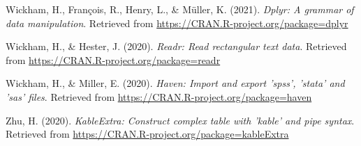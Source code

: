 \documentclass[
  english,
  man]{apa6}
\newlength{\cslhangindent}
\newenvironment{cslreferences}%
  {\setlength{\parindent}{0pt}%
  \everypar{\setlength{\hangindent}{\cslhangindent}}\ignorespaces}%
  {\par}
\begin{document}
\begin{cslreferences}
\leavevmode\hypertarget{ref-R-dplyr}{}%
Wickham, H., François, R., Henry, L., \& Müller, K. (2021). \emph{Dplyr: A grammar of data manipulation}. Retrieved from \url{https://CRAN.R-project.org/package=dplyr}

\leavevmode\hypertarget{ref-R-readr}{}%
Wickham, H., \& Hester, J. (2020). \emph{Readr: Read rectangular text data}. Retrieved from \url{https://CRAN.R-project.org/package=readr}

\leavevmode\hypertarget{ref-R-haven}{}%
Wickham, H., \& Miller, E. (2020). \emph{Haven: Import and export 'spss', 'stata' and 'sas' files}. Retrieved from \url{https://CRAN.R-project.org/package=haven}

\leavevmode\hypertarget{ref-R-kableExtra}{}%
Zhu, H. (2020). \emph{KableExtra: Construct complex table with 'kable' and pipe syntax}. Retrieved from \url{https://CRAN.R-project.org/package=kableExtra}
\end{cslreferences}

\endgroup
\end{document}

